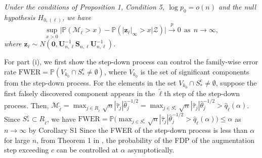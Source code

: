 \documentclass[12pt]{article}
\numberwithin{equation}{section}
\newtheorem{cy}{Corollary}
\newcommand{\bS}{{\mathbf S}}
\newcommand{\bU}{{\mathbf U}}
\newcommand{\bz}{{\mathbf z}}
\newcommand{\bzero}{{\mathbf 0}}
\begin{document}
\medskip

 {\it
Under the conditions of Proposition 1, Condition 5, $\log p_0 = o(n)$ and the null hypothesis $H_{0, (\ell)}$, we have
\[
\sup_{x>0}\big|\mathbb{P}(\mathcal{M}_{\ell}  > x ) - \mathbb{P}(|\bz_{\ell}|_{\infty} > x| \mathcal{Z})\big|\xrightarrow{p}0~~\textrm{as}~~n\rightarrow\infty,
\]
where $\bz_{\ell} \sim N(\bzero, \bU_{n, \ell}^{-1} \bS_{n, \ell} \bU_{n, \ell}^{-1})$. 
}

\medskip
{}
For part (i), we first show the step-down process can control the family-wise error rate $\mbox{FWER} = \mathbb{P}(V_{k_0} \cap S_{\ast}^{c} \neq \emptyset)$, where $V_{k_0}$ is the set of significant components from the step-down process.
For the elements in the set $V_{k_0} \cap S_{\ast}^{c} \neq \emptyset$, suppose the first falsely discovered component appears in the $\tilde{\ell}$th step of the step-down process.
Then, $\mathcal{M}_{\tilde{\ell}} = \max_{j \in R_{\tilde{\ell}}} \sqrt{n}|\hat{\tau}_{j}| \hat{\theta}_{j}^{-1/2} = \max_{j \in S_{\ast}^{c}} \sqrt{n}|\hat{\tau}_{j}| \hat{\theta}_{j}^{-1/2} > \hat{q}_{\tilde{\ell}}(\alpha)$.
Since $S_{\ast}^{c} \subset R_{\tilde{\ell}}$, we have $\mbox{FWER} = \mathbb{P}\big( \max_{j \in S^{c}_{\ast}} \sqrt{n}|\hat{\tau}_{j}| \hat{\theta}_{j}^{-1/2} > \hat{q}_{\tilde{\ell}}(\alpha) \big) \leq \alpha$ as $n \to \infty$ by Corollary S1
Since the FWER of the step-down process is less than $\alpha$ for large $n$, from Theorem 1 in \cite{GW_2006}, the probability of the FDP of the augmentation step exceeding $c$ can be controlled at $\alpha$ asymptotically.
\end{document}
